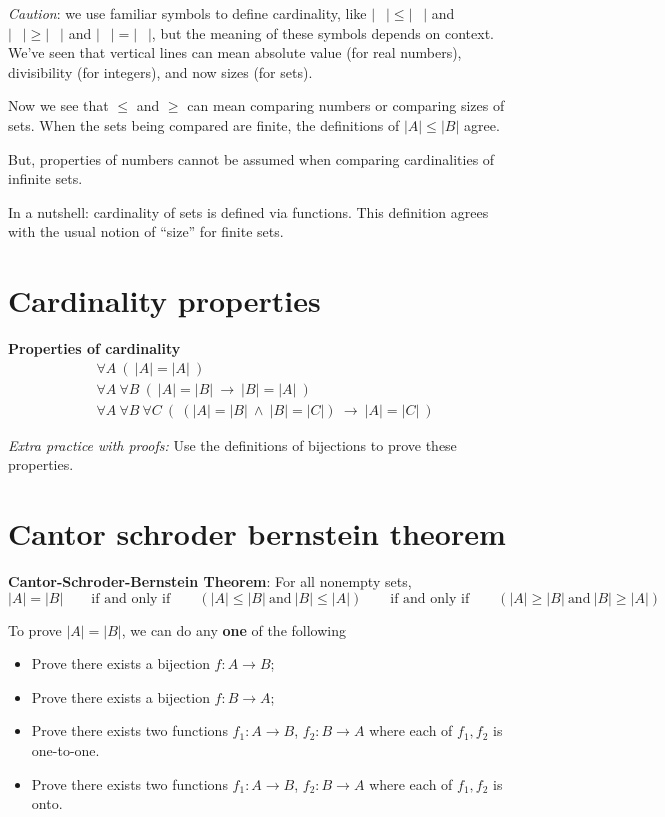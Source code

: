 \documentclass[12pt, oneside]{article}
\begin{document}
{\it Caution}: we use 
familiar symbols to define cardinality, like
$| \phantom{\cdots} | \leq | \phantom{\cdots} |$
and 
$| \phantom{\cdots} | \geq | \phantom{\cdots} |$
and 
$| \phantom{\cdots} | = | \phantom{\cdots} |$, 
but the meaning of these symbols depends on context.
We've seen that vertical lines can mean absolute
value (for real numbers), divisibility (for integers), 
and now sizes (for sets). 

Now we see that $\leq$ and $\geq$ can mean comparing
numbers or comparing sizes of sets. When the sets being 
compared are finite, the definitions 
of $|A| \leq |B|$ agree. 

But, properties of numbers cannot be assumed when comparing
cardinalities of infinite sets.

In a nutshell: cardinality of sets is defined via functions.
This definition agrees with the usual notion of ``size'' for 
finite sets. \vfill
\section*{Cardinality properties}


{\bf Properties of cardinality}
\begin{align*}
&\forall A ~ (~  |A| = |A| ~)\\
&\forall A ~ \forall B ~(~ |A| = |B|  ~\to ~ |B| = |A|~)\\
&\forall A ~ \forall B ~ \forall C~ (~ (|A| = |B| ~\wedge~ |B| = |C|) ~\to ~ |A| = |C|~)
\end{align*}

{\it Extra practice with proofs:} Use the definitions of bijections to prove these properties. \vfill
\section*{Cantor schroder bernstein theorem}


{\bf Cantor-Schroder-Bernstein Theorem}: For all nonempty sets,
\[
|A| = |B| \qquad\text{if and only if} \qquad (|A| \leq |B| ~\text{and}~ |B| \leq |A|)
\qquad\text{if and only if} \qquad (|A| \geq |B| ~\text{and}~ |B| \geq |A|)
\]

To prove $|A| = |B|$,  we can do any {\bf one} of the following

\begin{itemize}\setlength{\itemsep}{-5pt}
\item Prove there exists  a bijection $f:  A \to B$;
\item Prove there exists a  bijection  $f: B  \to  A$;
\item Prove there exists two functions $f_1: A \to B$, $f_2: B \to  A$ where each of $f_1, f_2$ is one-to-one.
\item Prove there exists two functions $f_1: A \to B$, $f_2: B \to  A$ where each of $f_1, f_2$ is onto.
\end{itemize} \vfill
\end{document}
